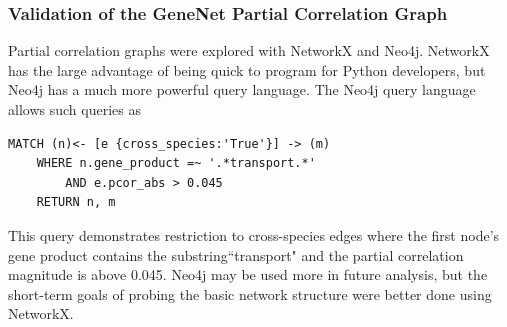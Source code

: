 \subsubsection{Validation of the GeneNet Partial Correlation Graph}

Partial correlation graphs were explored with NetworkX and Neo4j.
NetworkX has the large advantage of being quick to program for Python developers, but Neo4j has a much more powerful query language. 
The Neo4j query language allows such queries as 
\begin{verbatim} 
MATCH (n)<- [e {cross_species:'True'}] -> (m) 
    WHERE n.gene_product =~ '.*transport.*' 
        AND e.pcor_abs > 0.045 
    RETURN n, m 
\end{verbatim}
This query demonstrates restriction to cross-species edges where the first node's gene product contains the substring``transport" and the partial correlation magnitude is above 0.045.
Neo4j may be used more in future analysis, but the short-term goals of probing the basic network structure were better done using NetworkX.

